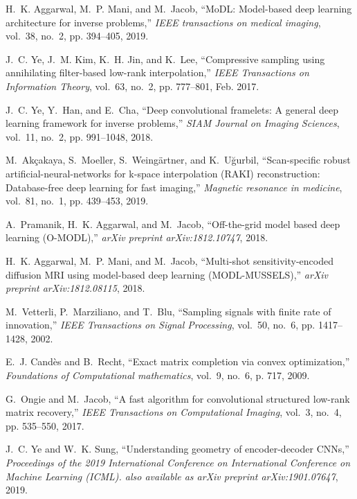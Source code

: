 \documentclass[10pt,journal]{IEEEtran}
\newcommand{\0}{{\boldsymbol{0}}}
\begin{document}
\begin{thebibliography}{10}
H.~K. Aggarwal, M.~P. Mani, and M.~Jacob, ``{MoDL}: Model-based deep learning
  architecture for inverse problems,'' \emph{IEEE transactions on medical
  imaging}, vol.~38, no.~2, pp. 394--405, 2019.

J.~C. Ye, J.~M. Kim, K.~H. Jin, and K.~Lee, ``Compressive sampling using
  annihilating filter-based low-rank interpolation,'' \emph{IEEE Transactions
  on Information Theory}, vol.~63, no.~2, pp. 777--801, Feb. 2017.

J.~C. Ye, Y.~Han, and E.~Cha, ``Deep convolutional framelets: A general deep
  learning framework for inverse problems,'' \emph{SIAM Journal on Imaging
  Sciences}, vol.~11, no.~2, pp. 991--1048, 2018.

M.~Ak{\c{c}}akaya, S.~Moeller, S.~Weing{\"a}rtner, and K.~U{\u{g}}urbil,
  ``Scan-specific robust artificial-neural-networks for k-space interpolation
  {(RAKI)} reconstruction: Database-free deep learning for fast imaging,''
  \emph{Magnetic resonance in medicine}, vol.~81, no.~1, pp. 439--453, 2019.

A.~Pramanik, H.~K. Aggarwal, and M.~Jacob, ``Off-the-grid model based deep
  learning {(O-MODL)},'' \emph{arXiv preprint arXiv:1812.10747}, 2018.

H.~K. Aggarwal, M.~P. Mani, and M.~Jacob, ``Multi-shot sensitivity-encoded
  diffusion {MRI} using model-based deep learning {(MODL-MUSSELS)},''
  \emph{arXiv preprint arXiv:1812.08115}, 2018.

M.~Vetterli, P.~Marziliano, and T.~Blu, ``Sampling signals with finite rate of
  innovation,'' \emph{IEEE Transactions on Signal Processing}, vol.~50, no.~6,
  pp. 1417--1428, 2002.

E.~J. Cand{\`e}s and B.~Recht, ``Exact matrix completion via convex
  optimization,'' \emph{Foundations of Computational mathematics}, vol.~9,
  no.~6, p. 717, 2009.

G.~Ongie and M.~Jacob, ``A fast algorithm for convolutional structured low-rank
  matrix recovery,'' \emph{IEEE Transactions on Computational Imaging}, vol.~3,
  no.~4, pp. 535--550, 2017.

J.~C. Ye and W.~K. Sung, ``Understanding geometry of encoder-decoder {CNNs},''
  \emph{Proceedings of the 2019 International Conference on International
  Conference on Machine Learning (ICML). also available as arXiv preprint
  arXiv:1901.07647}, 2019.


\end{thebibliography}
\end{document}
